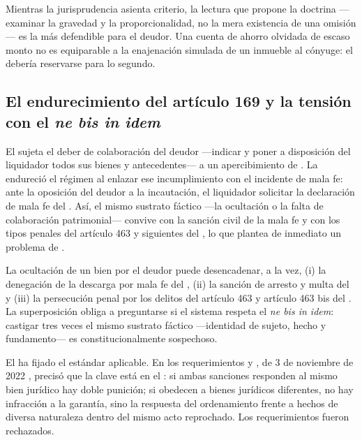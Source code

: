 \begin{foco}
Mientras la jurisprudencia asienta criterio, la lectura que propone la doctrina
---examinar la gravedad y la proporcionalidad, no la mera existencia de una omisión--- es la
más defendible para el deudor. Una cuenta de ahorro olvidada de escaso monto no es equiparable
a la enajenación simulada de un inmueble al cónyuge: el  debería reservarse para lo
segundo.
\end{foco}

\subsection{El endurecimiento del artículo 169 y la tensión con el \emph{ne bis in idem}}

El  sujeta el deber de colaboración del deudor ---indicar y poner a disposición del
liquidador todos sus bienes y antecedentes--- a un apercibimiento de . La \Lreforma{} \citeyearpar{ley-21563} endureció el régimen
al enlazar ese incumplimiento con el incidente de mala fe: ante la oposición del deudor a la
incautación, el liquidador  solicitar la declaración de mala fe del .
Así, el mismo sustrato fáctico ---la ocultación o la falta de colaboración patrimonial--- convive
con la sanción civil de la mala fe y con los tipos penales del artículo 463 y siguientes del
\cpen{}, lo que plantea de inmediato un problema de .

\begin{alerta}
La ocultación de un bien por el deudor puede desencadenar, a la vez, (i) la denegación de la
descarga por mala fe del , (ii) la sanción de arresto y multa del  y (iii) la
persecución penal por los delitos del artículo 463 y artículo 463 bis del \cpen{}. La superposición
obliga a preguntarse si el sistema respeta el \emph{ne bis in idem}: castigar tres veces el mismo
sustrato fáctico ---identidad de sujeto, hecho y fundamento--- es constitucionalmente sospechoso.
\end{alerta}

El  ha fijado el estándar aplicable. En los requerimientos
 y , de 3 de noviembre de 2022
\parencite{juris-tc-nebisinidem}, precisó que la clave está en el : si ambas sanciones responden al mismo bien jurídico hay doble punición; si obedecen a
bienes jurídicos diferentes, no hay infracción a la garantía, sino la respuesta del ordenamiento
frente a hechos de diversa naturaleza dentro del mismo acto reprochado. Los requerimientos fueron
rechazados.

